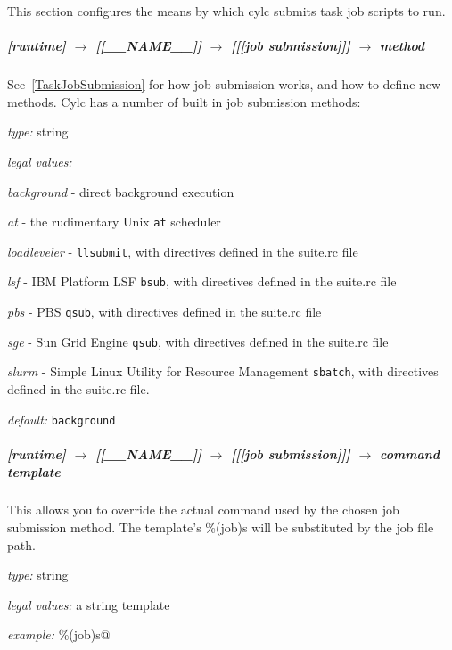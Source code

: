 This section configures the means by which cylc submits task job scripts to run.

\subparagraph[method]{[runtime] $\rightarrow$ [[\_\_NAME\_\_]] $\rightarrow$ [[[job submission]]] $\rightarrow$ method}
\label{RuntimeJobSubMethods}

See~\ref{TaskJobSubmission} for how job submission works, and how to define
new methods.  Cylc has a number of built in job submission methods:
\begin{myitemize}
\item {\em type:} string
\item {\em legal values:}
   \begin{myitemize}
       \item {\em background} - direct background execution
       \item {\em at} - the rudimentary Unix \lstinline=at= scheduler
       \item {\em loadleveler} - \lstinline=llsubmit=, with directives defined in the suite.rc file
       \item {\em lsf} - IBM Platform LSF \lstinline=bsub=, with directives defined in the suite.rc file
       \item {\em pbs} - PBS \lstinline=qsub=, with directives defined in the suite.rc file
       \item {\em sge} - Sun Grid Engine \lstinline=qsub=, with directives defined in the suite.rc file
       \item {\em slurm} - Simple Linux Utility for Resource Management \lstinline=sbatch=, with directives defined in the suite.rc file.
   \end{myitemize}
\item {\em default:} \lstinline=background=
\end{myitemize}

\subparagraph[command template]{[runtime] $\rightarrow$ [[\_\_NAME\_\_]] $\rightarrow$ [[[job submission]]] $\rightarrow$ command template}

This allows you to override the actual command used by the chosen job
submission method. The template's \%(job)s will be substituted by the
job file path.

\begin{myitemize}
\item {\em type:} string
\item {\em legal values:} a string template
\item {\em example:} \lstinline@llsubmit \%(job)s@
\end{myitemize}

